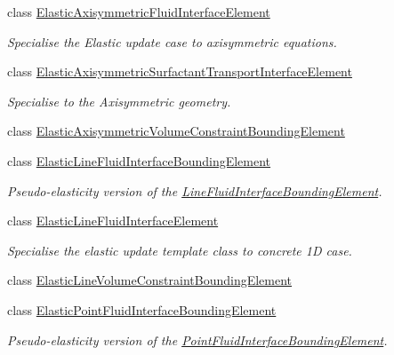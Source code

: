\begin{DoxyCompactItemize}
\item 
class \hyperlink{classoomph_1_1ElasticAxisymmetricFluidInterfaceElement}{Elastic\+Axisymmetric\+Fluid\+Interface\+Element}
\begin{DoxyCompactList}\small\item\em Specialise the Elastic update case to axisymmetric equations. \end{DoxyCompactList}\item 
class \hyperlink{classoomph_1_1ElasticAxisymmetricSurfactantTransportInterfaceElement}{Elastic\+Axisymmetric\+Surfactant\+Transport\+Interface\+Element}
\begin{DoxyCompactList}\small\item\em Specialise to the Axisymmetric geometry. \end{DoxyCompactList}\item 
class \hyperlink{classoomph_1_1ElasticAxisymmetricVolumeConstraintBoundingElement}{Elastic\+Axisymmetric\+Volume\+Constraint\+Bounding\+Element}
\item 
class \hyperlink{classoomph_1_1ElasticLineFluidInterfaceBoundingElement}{Elastic\+Line\+Fluid\+Interface\+Bounding\+Element}
\begin{DoxyCompactList}\small\item\em Pseudo-\/elasticity version of the \hyperlink{classoomph_1_1LineFluidInterfaceBoundingElement}{Line\+Fluid\+Interface\+Bounding\+Element}. \end{DoxyCompactList}\item 
class \hyperlink{classoomph_1_1ElasticLineFluidInterfaceElement}{Elastic\+Line\+Fluid\+Interface\+Element}
\begin{DoxyCompactList}\small\item\em Specialise the elastic update template class to concrete 1D case. \end{DoxyCompactList}\item 
class \hyperlink{classoomph_1_1ElasticLineVolumeConstraintBoundingElement}{Elastic\+Line\+Volume\+Constraint\+Bounding\+Element}
\item 
class \hyperlink{classoomph_1_1ElasticPointFluidInterfaceBoundingElement}{Elastic\+Point\+Fluid\+Interface\+Bounding\+Element}
\begin{DoxyCompactList}\small\item\em Pseudo-\/elasticity version of the \hyperlink{classoomph_1_1PointFluidInterfaceBoundingElement}{Point\+Fluid\+Interface\+Bounding\+Element}. \end{DoxyCompactList}\item 

\end{DoxyCompactItemize}
